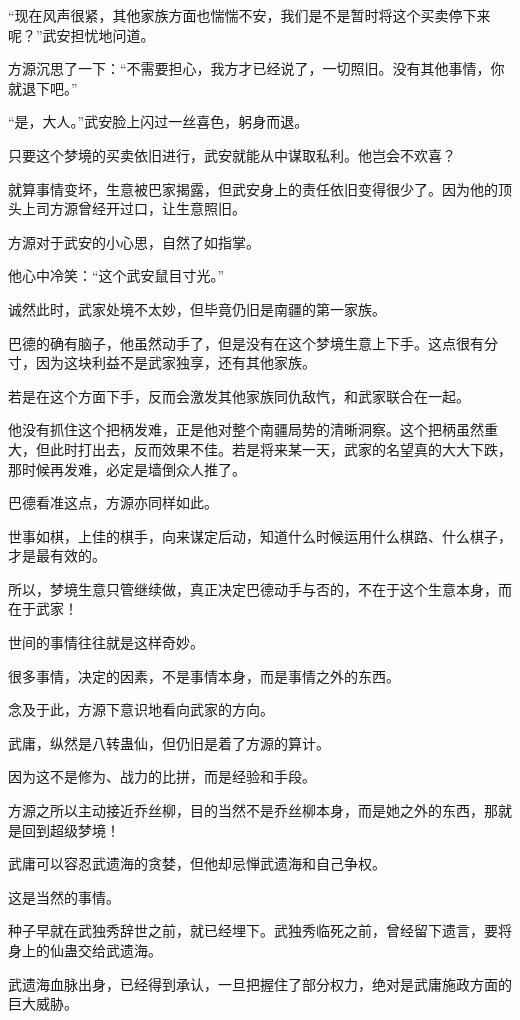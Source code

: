 \begin{this_body}
“现在风声很紧，其他家族方面也惴惴不安，我们是不是暂时将这个买卖停下来呢？”武安担忧地问道。

方源沉思了一下：“不需要担心，我方才已经说了，一切照旧。没有其他事情，你就退下吧。”

“是，大人。”武安脸上闪过一丝喜色，躬身而退。

只要这个梦境的买卖依旧进行，武安就能从中谋取私利。他岂会不欢喜？

就算事情变坏，生意被巴家揭露，但武安身上的责任依旧变得很少了。因为他的顶头上司方源曾经开过口，让生意照旧。

方源对于武安的小心思，自然了如指掌。

他心中冷笑：“这个武安鼠目寸光。”

诚然此时，武家处境不太妙，但毕竟仍旧是南疆的第一家族。

巴德的确有脑子，他虽然动手了，但是没有在这个梦境生意上下手。这点很有分寸，因为这块利益不是武家独享，还有其他家族。

若是在这个方面下手，反而会激发其他家族同仇敌忾，和武家联合在一起。

他没有抓住这个把柄发难，正是他对整个南疆局势的清晰洞察。这个把柄虽然重大，但此时打出去，反而效果不佳。若是将来某一天，武家的名望真的大大下跌，那时候再发难，必定是墙倒众人推了。

巴德看准这点，方源亦同样如此。

世事如棋，上佳的棋手，向来谋定后动，知道什么时候运用什么棋路、什么棋子，才是最有效的。

所以，梦境生意只管继续做，真正决定巴德动手与否的，不在于这个生意本身，而在于武家！

世间的事情往往就是这样奇妙。

很多事情，决定的因素，不是事情本身，而是事情之外的东西。

念及于此，方源下意识地看向武家的方向。

武庸，纵然是八转蛊仙，但仍旧是着了方源的算计。

因为这不是修为、战力的比拼，而是经验和手段。

方源之所以主动接近乔丝柳，目的当然不是乔丝柳本身，而是她之外的东西，那就是回到超级梦境！

武庸可以容忍武遗海的贪婪，但他却忌惮武遗海和自己争权。

这是当然的事情。

种子早就在武独秀辞世之前，就已经埋下。武独秀临死之前，曾经留下遗言，要将身上的仙蛊交给武遗海。

武遗海血脉出身，已经得到承认，一旦把握住了部分权力，绝对是武庸施政方面的巨大威胁。


\end{this_body}
